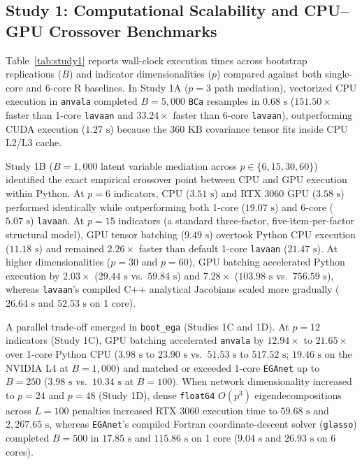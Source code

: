 ﻿\documentclass[12pt,letterpaper]{article}
\begin{document}
\subsection{Study 1: Computational Scalability and CPU--GPU Crossover Benchmarks}

Table~\ref{tab:study1} reports wall-clock execution times across bootstrap replications ($B$) and indicator dimensionalities ($p$) compared against both single-core and 6-core R baselines. In Study 1A ($p = 3$ path mediation), vectorized CPU execution in \texttt{anvala} completed $B = 5{,}000$ \texttt{BCa} resamples in $0.68\text{ s}$ ($151.50\times$ faster than 1-core \texttt{lavaan} and $33.24\times$ faster than 6-core \texttt{lavaan}), outperforming CUDA execution ($1.27\text{ s}$) because the $360\text{ KB}$ covariance tensor fits inside CPU L2/L3 cache.

Study 1B ($B = 1{,}000$ latent variable mediation across $p \in \{6, 15, 30, 60\}$) identified the exact empirical crossover point between CPU and GPU execution within Python. At $p = 6$ indicators, CPU ($3.51\text{ s}$) and RTX 3060 GPU ($3.58\text{ s}$) performed identically while outperforming both 1-core ($19.07\text{ s}$) and 6-core ($5.07\text{ s}$) \texttt{lavaan}. At $p = 15$ indicators (a standard three-factor, five-item-per-factor structural model), GPU tensor batching ($9.49\text{ s}$) overtook Python CPU execution ($11.18\text{ s}$) and remained $2.26\times$ faster than default 1-core \texttt{lavaan} ($21.47\text{ s}$). At higher dimensionalities ($p = 30$ and $p = 60$), GPU batching accelerated Python execution by $2.03\times$ ($29.44\text{ s}$ vs.\ $59.84\text{ s}$) and $7.28\times$ ($103.98\text{ s}$ vs.\ $756.59\text{ s}$), whereas \texttt{lavaan}'s compiled C++ analytical Jacobians scaled more gradually ($26.64\text{ s}$ and $52.53\text{ s}$ on 1 core).

A parallel trade-off emerged in \texttt{boot\_ega} (Studies 1C and 1D). At $p = 12$ indicators (Study 1C), GPU batching accelerated \texttt{anvala} by $12.94\times$ to $21.65\times$ over 1-core Python CPU ($3.98\text{ s}$ to $23.90\text{ s}$ vs.\ $51.53\text{ s}$ to $517.52\text{ s}$; $19.46\text{ s}$ on the NVIDIA L4 at $B = 1{,}000$) and matched or exceeded 1-core \texttt{EGAnet} up to $B = 250$ ($3.98\text{ s}$ vs.\ $10.34\text{ s}$ at $B = 100$). When network dimensionality increased to $p = 24$ and $p = 48$ (Study 1D), dense \texttt{float64} $O(p^3)$ eigendecompositions across $L = 100$ penalties increased RTX 3060 execution time to $59.68\text{ s}$ and $2{,}267.65\text{ s}$, whereas \texttt{EGAnet}'s compiled Fortran coordinate-descent solver (\texttt{glasso}) completed $B = 500$ in $17.85\text{ s}$ and $115.86\text{ s}$ on 1 core ($9.04\text{ s}$ and $26.93\text{ s}$ on 6 cores).
\end{document}
